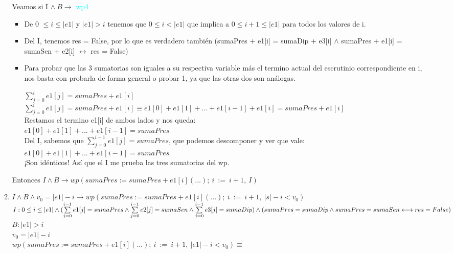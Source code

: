 \documentclass[10pt,a4paper]{article}
\begin{document}
\begin{enumerate}
\begin{enumerate}
Veamos si I $\land \: B \longrightarrow$ \textcolor{cyan}{wp4}
\begin{itemize}
    \item De 0 $\leq i \leq |e1|$ y $|e1| > i$ tenemos que $0 \leq i < |e1|$ que implica a $0 \leq i + 1 \leq |e1|$ para todos los valores de i.
    \item Del I, tenemos res = False, por lo que es verdadero tambi\'en (sumaPres + e1[i] = sumaDip + e3[i]  $\land$ sumaPres + e1[i] = sumaSen + e2[i] $\longleftrightarrow$ res = False)
    \item Para probar que las 3 sumatorias son iguales a su respectiva variable más el termino actual del escrutinio correspondiente en i, nos basta con probarla de forma general o probar 1, ya que las otras dos son an\'alogas.
    \begin{center}
        $\sum\limits_{j=0}^{i} e1[j] = sumaPres + e1[i]$
        $\sum\limits_{j=0}^{i} e1[j] = sumaPres + e1[i] \equiv e1[0] + e1[1] + ... + e1[i-1] + e1[i] = sumaPres + e1[i] $ \\
        Restamos el termino e1[i] de ambos lados y nos queda: \\
        
        $e1[0] + e1[1] + ... + e1[i-1] = sumaPres$\\

        Del I, sabemos que $\sum\limits_{j=0}^{i - 1} e1[j] = sumaPres$, que podemos descomponer y ver que vale: \\
        $e1[0] + e1[1] + ... + e1[i-1] = sumaPres$ \\
        ¡Son id\'enticos! Así que el I me prueba las tres sumatorias del wp.
    \end{center}
\end{itemize}
Entonces $I \land B \longrightarrow wp(sumaPres := sumaPres + e1[i](\ldots);\: i \: := \: i + 1, \: I)$

\item $I \land B \land v_0 = |e1| - i \longrightarrow wp(sumaPres := sumaPres + e1[i](\ldots);\: i \: := \: i + 1, \: |s| - i < v_0)$\\
$I : 0 \leq i \leq |e1| \land (\sum\limits_{j=0}^{i - 1} e1[j] = sumaPres \land \sum\limits_{j=0}^{i - 1} e2[j] = sumaSen \land \sum\limits_{j=0}^{i - 1} e3[j] = sumaDip) \land \\
    (sumaPres = sumaDip  \land sumaPres = sumaSen \longleftrightarrow res = False)$ \\
$B : |e1| > i$ \\
$v_0 = |e1| - i$ \\
$wp(sumaPres := sumaPres + e1[i](\ldots);\: i \: := \: i + 1, \: |e1| - i < v_0) \equiv$


\end{enumerate}
\end{enumerate}
\end{document}
